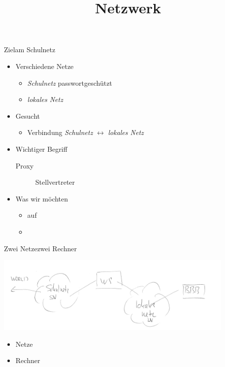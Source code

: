 \documentclass{beamer}
\title[Netzwerk]{Netzwerk}
\begin{document}
\frame{\titlepage}

\begin{frame}{Ziel}{\target am Schulnetz}
 \begin{itemize}
  \item Verschiedene Netze
  \begin{itemize}
   \item {\em Schulnetz} passwortgeschützt
   \item {\em lokales Netz} \host{} \target 
  \end{itemize}
  \item Gesucht
  \begin{itemize}
   \item Verbindung {\em Schulnetz} $\leftrightarrow$ {\em lokales Netz}
  \end{itemize}
  \item Wichtiger Begriff
  \begin{description}
   \item[Proxy] Stellvertreter
  \end{description}
  \item Was wir möchten
  \begin{itemize}
   \item {} auf \target
   \item {}
  \end{itemize}
 \end{itemize}
\end{frame}

\begin{frame}{Zwei Netze}{zwei Rechner}
 \begin{center}
 \includegraphics[width=0.875\textwidth]{two-networks.png}
 \end{center}
 \begin{itemize}
  \item Netze
  \item Rechner
 \end{itemize}
\end{frame}
\end{document}
